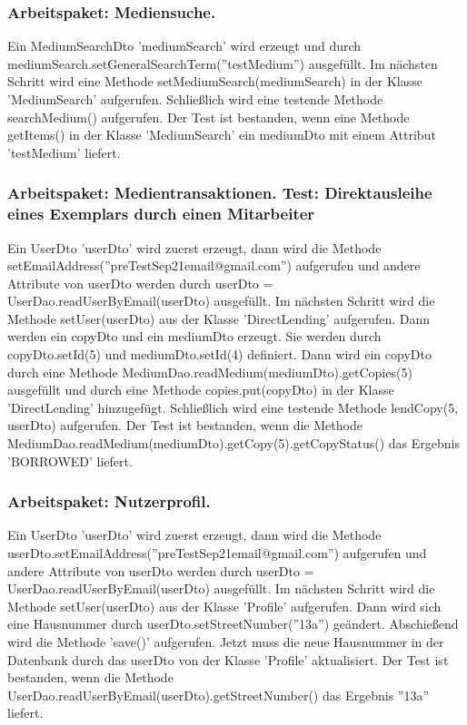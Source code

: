 \documentclass{article}
\begin{document}
\subsubsection{Arbeitspaket: Mediensuche.}
Ein MediumSearchDto 'mediumSearch' wird erzeugt und durch \linebreak mediumSearch.setGeneralSearchTerm(''testMedium'') ausgefüllt. Im nächsten Schritt wird eine Methode setMediumSearch(mediumSearch) in der Klasse 'MediumSearch' aufgerufen. Schließlich wird eine testende Methode searchMedium() aufgerufen. Der Test ist bestanden, wenn eine Methode getItems() in der Klasse 'MediumSearch' ein mediumDto mit einem Attribut 'testMedium' liefert.

\subsubsection{Arbeitspaket: Medientransaktionen. Test: Direktausleihe eines Exemplars durch einen Mitarbeiter}
Ein UserDto 'userDto' wird zuerst erzeugt, dann wird die Methode \linebreak setEmailAddress(''preTestSep21email@gmail.com'') aufgerufen und andere Attribute von userDto werden durch userDto = UserDao.readUserByEmail(userDto) ausgefüllt. Im nächsten Schritt wird die Methode setUser(userDto) aus der Klasse 'DirectLending' aufgerufen. Dann werden ein copyDto und ein mediumDto erzeugt. Sie werden durch copyDto.setId(5) und mediumDto.setId(4) definiert. Dann wird ein copyDto durch eine Methode MediumDao.readMedium(mediumDto).getCopies(5) ausgefüllt und durch eine Methode copies.put(copyDto) in der Klasse 'DirectLending' hinzugefügt. Schließlich wird eine testende Methode lendCopy(5, userDto) aufgerufen. Der Test ist bestanden, wenn die Methode MediumDao.readMedium(mediumDto).getCopy(5).getCopyStatus() das Ergebnis 'BORROWED' liefert.

\subsubsection{Arbeitspaket: Nutzerprofil.}
Ein UserDto 'userDto' wird zuerst erzeugt, dann wird die Methode \linebreak userDto.setEmailAddress(''preTestSep21email@gmail.com'') aufgerufen und andere Attribute von userDto werden durch userDto = UserDao.readUserByEmail(userDto) ausgefüllt. Im nächsten \linebreak Schritt wird die Methode setUser(userDto) aus der Klasse 'Profile' aufgerufen. Dann wird sich eine Hausnummer durch userDto.setStreetNumber(''13a'') geändert. Abschießend wird die Methode 'save()' aufgerufen. Jetzt muss die neue Hausnummer in der Datenbank durch das userDto von der Klasse 'Profile' aktualisiert. Der Test ist bestanden, wenn die Methode \linebreak UserDao.readUserByEmail(userDto).getStreetNumber() das Ergebnis ''13a'' liefert.
\end{document}

